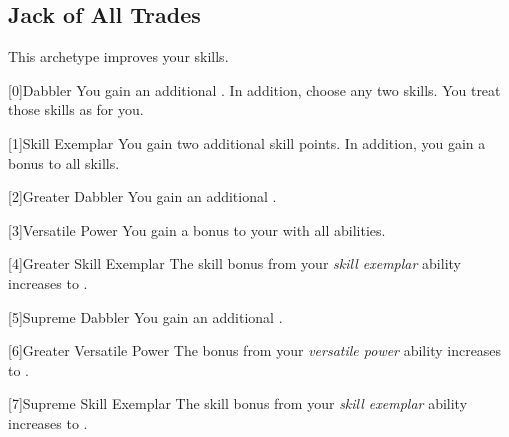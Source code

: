     \newpage
    \subsection{Jack of All Trades}
        This archetype improves your skills.

        [0]{Dabbler} You gain an additional .
        In addition, choose any two skills.
        You treat those skills as  for you.

        [1]{Skill Exemplar} You gain two additional skill points.
        In addition, you gain a  bonus to all skills.

        [2]{Greater Dabbler} You gain an additional .

        [3]{Versatile Power}
        You gain a  bonus to your  with all abilities.

        [4]{Greater Skill Exemplar} The skill bonus from your \textit{skill exemplar} ability increases to .

        [5]{Supreme Dabbler} You gain an additional .

        [6]{Greater Versatile Power} The bonus from your \textit{versatile power} ability increases to .

        [7]{Supreme Skill Exemplar} The skill bonus from your \textit{skill exemplar} ability increases to .




